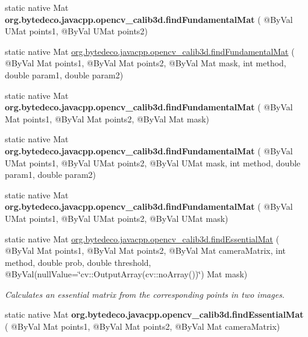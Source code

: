 \begin{DoxyCompactItemize}
\item 
\mbox{\label{group__calib3d_ga517d13a724fcae1763cefba9174043d8}} 
static native Mat {\bfseries org.\+bytedeco.\+javacpp.\+opencv\+\_\+calib3d.\+find\+Fundamental\+Mat} ( @By\+Val U\+Mat points1, @By\+Val U\+Mat points2)
\item 
static native Mat \hyperlink{group__calib3d_ga1a8446757231db93d44c99331ac4747d}{org.\+bytedeco.\+javacpp.\+opencv\+\_\+calib3d.\+find\+Fundamental\+Mat} ( @By\+Val Mat points1, @By\+Val Mat points2, @By\+Val Mat mask, int method, double param1, double param2)
\item 
\mbox{\label{group__calib3d_ga0cc3d884d531ba56729389786e247e7e}} 
static native Mat {\bfseries org.\+bytedeco.\+javacpp.\+opencv\+\_\+calib3d.\+find\+Fundamental\+Mat} ( @By\+Val Mat points1, @By\+Val Mat points2, @By\+Val Mat mask)
\item 
\mbox{\label{group__calib3d_ga45d4b9b84de214ae9fe848ab74703306}} 
static native Mat {\bfseries org.\+bytedeco.\+javacpp.\+opencv\+\_\+calib3d.\+find\+Fundamental\+Mat} ( @By\+Val U\+Mat points1, @By\+Val U\+Mat points2, @By\+Val U\+Mat mask, int method, double param1, double param2)
\item 
\mbox{\label{group__calib3d_ga99252726cb03123a93d72e760517a9be}} 
static native Mat {\bfseries org.\+bytedeco.\+javacpp.\+opencv\+\_\+calib3d.\+find\+Fundamental\+Mat} ( @By\+Val U\+Mat points1, @By\+Val U\+Mat points2, @By\+Val U\+Mat mask)
\item 
static native Mat \hyperlink{group__calib3d_gad86954f592d1f99b0f8cdec7f4134c7a}{org.\+bytedeco.\+javacpp.\+opencv\+\_\+calib3d.\+find\+Essential\+Mat} ( @By\+Val Mat points1, @By\+Val Mat points2, @By\+Val Mat camera\+Matrix, int method, double prob, double threshold, @By\+Val(null\+Value=\char`\"{}cv\+::\+Output\+Array(cv\+::no\+Array())\char`\"{}) Mat mask)
\begin{DoxyCompactList}\small\item\em Calculates an essential matrix from the corresponding points in two images. \end{DoxyCompactList}\item 
\mbox{\label{group__calib3d_ga56ce323a1d0304739ef11e60f0a065e8}} 
static native Mat {\bfseries org.\+bytedeco.\+javacpp.\+opencv\+\_\+calib3d.\+find\+Essential\+Mat} ( @By\+Val Mat points1, @By\+Val Mat points2, @By\+Val Mat camera\+Matrix)

\end{DoxyCompactItemize}
